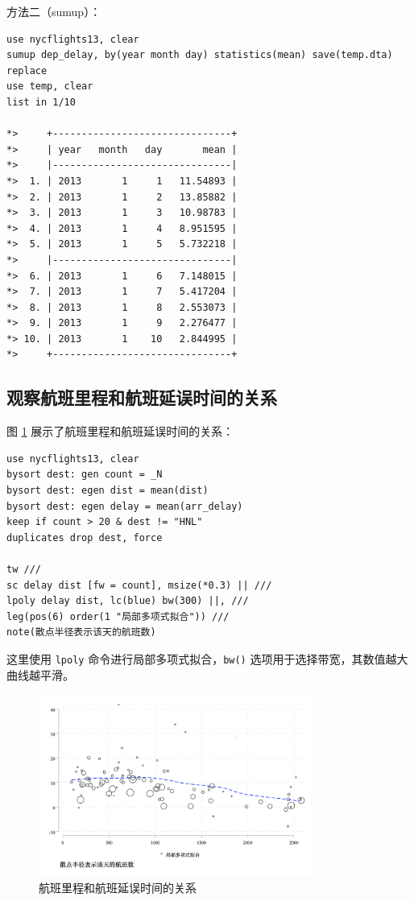 \documentclass[]{ctexbook}
\begin{document}
方法二（sumup）：

\begin{lstlisting}
use nycflights13, clear
sumup dep_delay, by(year month day) statistics(mean) save(temp.dta) replace
use temp, clear
list in 1/10

*>     +-------------------------------+
*>     | year   month   day       mean |
*>     |-------------------------------|
*>  1. | 2013       1     1   11.54893 |
*>  2. | 2013       1     2   13.85882 |
*>  3. | 2013       1     3   10.98783 |
*>  4. | 2013       1     4   8.951595 |
*>  5. | 2013       1     5   5.732218 |
*>     |-------------------------------|
*>  6. | 2013       1     6   7.148015 |
*>  7. | 2013       1     7   5.417204 |
*>  8. | 2013       1     8   2.553073 |
*>  9. | 2013       1     9   2.276477 |
*> 10. | 2013       1    10   2.844995 |
*>     +-------------------------------+
\end{lstlisting}

\hypertarget{section-51}{%
\subsection{观察航班里程和航班延误时间的关系}\label{section-51}}

图 \ref{fig:delaydist} 展示了航班里程和航班延误时间的关系：

\begin{lstlisting}
use nycflights13, clear
bysort dest: gen count = _N 
bysort dest: egen dist = mean(dist)
bysort dest: egen delay = mean(arr_delay)
keep if count > 20 & dest != "HNL"
duplicates drop dest, force

tw ///
sc delay dist [fw = count], msize(*0.3) || ///
lpoly delay dist, lc(blue) bw(300) ||, ///
leg(pos(6) order(1 "局部多项式拟合")) ///
note(散点半径表示该天的航班数)
\end{lstlisting}

这里使用 \texttt{lpoly} 命令进行局部多项式拟合，\texttt{bw()} 选项用于选择带宽，其数值越大曲线越平滑。

\begin{figure}

{\centering \includegraphics[width=0.8\textwidth]{assets/delaydist} 

}

\caption{航班里程和航班延误时间的关系}\label{fig:delaydist}
\end{figure}
\end{document}
